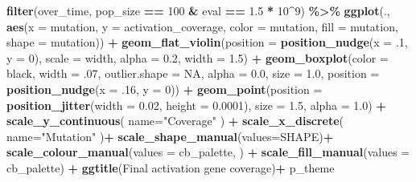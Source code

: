 \documentclass[
]{book}
\newenvironment{Shaded}{\begin{snugshade}}{\end{snugshade}}
\newcommand{\AttributeTok}[1]{\textcolor[rgb]{0.13,0.29,0.53}{#1}}
\newcommand{\ConstantTok}[1]{\textcolor[rgb]{0.56,0.35,0.01}{#1}}
\newcommand{\DecValTok}[1]{\textcolor[rgb]{0.00,0.00,0.81}{#1}}
\newcommand{\FloatTok}[1]{\textcolor[rgb]{0.00,0.00,0.81}{#1}}
\newcommand{\FunctionTok}[1]{\textcolor[rgb]{0.13,0.29,0.53}{\textbf{#1}}}
\newcommand{\NormalTok}[1]{#1}
\newcommand{\SpecialCharTok}[1]{\textcolor[rgb]{0.81,0.36,0.00}{\textbf{#1}}}
\newcommand{\StringTok}[1]{\textcolor[rgb]{0.31,0.60,0.02}{#1}}
\begin{document}
\begin{Shaded}
\begin{Highlighting}[]
\FunctionTok{filter}\NormalTok{(over\_time, pop\_size }\SpecialCharTok{==} \DecValTok{100} \SpecialCharTok{\&}\NormalTok{ eval }\SpecialCharTok{==} \FloatTok{1.5} \SpecialCharTok{*} \DecValTok{10}\SpecialCharTok{\^{}}\DecValTok{9}\NormalTok{) }\SpecialCharTok{\%\textgreater{}\%}
  \FunctionTok{ggplot}\NormalTok{(., }\FunctionTok{aes}\NormalTok{(}\AttributeTok{x =}\NormalTok{ mutation, }\AttributeTok{y =}\NormalTok{ activation\_coverage, }\AttributeTok{color =}\NormalTok{ mutation, }\AttributeTok{fill =}\NormalTok{ mutation, }\AttributeTok{shape =}\NormalTok{ mutation)) }\SpecialCharTok{+}
  \FunctionTok{geom\_flat\_violin}\NormalTok{(}\AttributeTok{position =} \FunctionTok{position\_nudge}\NormalTok{(}\AttributeTok{x =}\NormalTok{ .}\DecValTok{1}\NormalTok{, }\AttributeTok{y =} \DecValTok{0}\NormalTok{), }\AttributeTok{scale =} \StringTok{\textquotesingle{}width\textquotesingle{}}\NormalTok{, }\AttributeTok{alpha =} \FloatTok{0.2}\NormalTok{, }\AttributeTok{width =} \FloatTok{1.5}\NormalTok{) }\SpecialCharTok{+}
  \FunctionTok{geom\_boxplot}\NormalTok{(}\AttributeTok{color =} \StringTok{\textquotesingle{}black\textquotesingle{}}\NormalTok{, }\AttributeTok{width =}\NormalTok{ .}\DecValTok{07}\NormalTok{, }\AttributeTok{outlier.shape =} \ConstantTok{NA}\NormalTok{, }\AttributeTok{alpha =} \FloatTok{0.0}\NormalTok{, }\AttributeTok{size =} \FloatTok{1.0}\NormalTok{, }\AttributeTok{position =} \FunctionTok{position\_nudge}\NormalTok{(}\AttributeTok{x =}\NormalTok{ .}\DecValTok{16}\NormalTok{, }\AttributeTok{y =} \DecValTok{0}\NormalTok{)) }\SpecialCharTok{+}
  \FunctionTok{geom\_point}\NormalTok{(}\AttributeTok{position =} \FunctionTok{position\_jitter}\NormalTok{(}\AttributeTok{width =} \FloatTok{0.02}\NormalTok{, }\AttributeTok{height =} \FloatTok{0.0001}\NormalTok{), }\AttributeTok{size =} \FloatTok{1.5}\NormalTok{, }\AttributeTok{alpha =} \FloatTok{1.0}\NormalTok{) }\SpecialCharTok{+}
  \FunctionTok{scale\_y\_continuous}\NormalTok{(}
    \AttributeTok{name=}\StringTok{"Coverage"}
\NormalTok{  ) }\SpecialCharTok{+}
  \FunctionTok{scale\_x\_discrete}\NormalTok{(}
    \AttributeTok{name=}\StringTok{"Mutation"}
\NormalTok{  )}\SpecialCharTok{+}
  \FunctionTok{scale\_shape\_manual}\NormalTok{(}\AttributeTok{values=}\NormalTok{SHAPE)}\SpecialCharTok{+}
  \FunctionTok{scale\_colour\_manual}\NormalTok{(}\AttributeTok{values =}\NormalTok{ cb\_palette, ) }\SpecialCharTok{+}
  \FunctionTok{scale\_fill\_manual}\NormalTok{(}\AttributeTok{values =}\NormalTok{ cb\_palette) }\SpecialCharTok{+}
  \FunctionTok{ggtitle}\NormalTok{(}\StringTok{\textquotesingle{}Final activation gene coverage\textquotesingle{}}\NormalTok{)}\SpecialCharTok{+}
\NormalTok{  p\_theme}
\end{Highlighting}
\end{Shaded}
\end{document}
